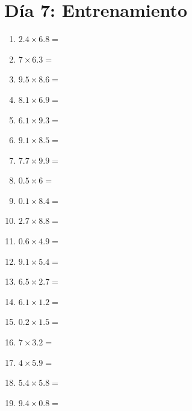 \documentclass[12pt]{article}
\begin{document}
\section*{Día 7: Entrenamiento}
\begin{enumerate}
\item \large $ 2.4 \times 6.8 = $ \vspace{1.5cm}
\item \large $ 7 \times 6.3 = $ \vspace{1.5cm}
\item \large $ 9.5 \times 8.6 = $ \vspace{1.5cm}
\item \large $ 8.1 \times 6.9 = $ \vspace{1.5cm}
\item \large $ 6.1 \times 9.3 = $ \vspace{1.5cm}
\item \large $ 9.1 \times 8.5 = $ \vspace{1.5cm}
\item \large $ 7.7 \times 9.9 = $ \vspace{1.5cm}
\item \large $ 0.5 \times 6 = $ \vspace{1.5cm}
\item \large $ 0.1 \times 8.4 = $ \vspace{1.5cm}
\item \large $ 2.7 \times 8.8 = $ \vspace{1.5cm}
\newpage
\item \large $ 0.6 \times 4.9 = $ \vspace{1.5cm}
\item \large $ 9.1 \times 5.4 = $ \vspace{1.5cm}
\item \large $ 6.5 \times 2.7 = $ \vspace{1.5cm}
\item \large $ 6.1 \times 1.2 = $ \vspace{1.5cm}
\item \large $ 0.2 \times 1.5 = $ \vspace{1.5cm}
\item \large $ 7 \times 3.2 = $ \vspace{1.5cm}
\item \large $ 4 \times 5.9 = $ \vspace{1.5cm}
\item \large $ 5.4 \times 5.8 = $ \vspace{1.5cm}
\item \large $ 9.4 \times 0.8 = $ \vspace{1.5cm}

\end{enumerate}
\end{document}
